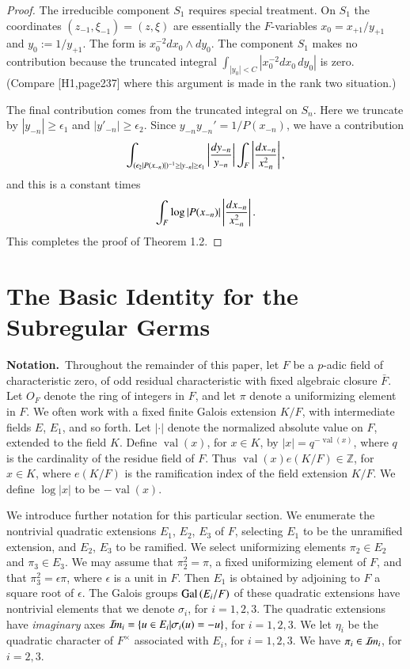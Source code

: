 \documentclass{amsart}
\newcommand\Z{{\mathbb Z}}
\newcommand\Gal{\hbox{Gal\,}}
\newcommand\Imm{{\mathcal I\hskip-.2em m}}
\newcommand\bF{{\bar F}}
\newcommand\val{\operatorname{val}}
\begin{document}
\begin{proof}
The irreducible component $S_1$ requires special treatment.
On $S_1$ the coordinates $(z_{-1},\xi_{-1}) = (z,\xi)$
are essentially the $F$-variables $x_0 = x_{+1}/y_{+1}$
and $y_0 := 1/y_{+1}$.  The form is $x_0^{-2} dx_0\wedge dy_0$.
The component $S_1$ makes no contribution because the truncated
integral $\int_{|y_0|< C} |x_0^{-2} dx_0\,dy_0|$ is zero.
(Compare [H1,page237] where this argument is made in the
rank two situation.)

The final contribution comes from the truncated integral on $S_n$.
Here we truncate by $|y_{-n}|\ge \epsilon_1$ and $|y'_{-n}|\ge \epsilon_2$.
Since $y_{-n}y_{-n}' = 1/P(x_{-n})$, we have a contribution
$$
\int_{(\epsilon_2 |P(x_{-n})|)^{-1} \ge |y_{-n}|\ge \epsilon_1}
\left| {dy_{-n}\over y_{-n}} \right |
\int_F \left|{dx_{-n}\over x_{-n}^2}\right |,$$
and this is a constant times
$$\int_F \log|P(x_{-n})| \left|{dx_{-n}\over x_{-n}^2}\right|.$$
This completes the proof of Theorem 1.2.
\end{proof}

\section{The Basic Identity for the Subregular Germs}

\noindent
{\bf Notation.}\  
Throughout the remainder of this paper,
let $F$ be a $p$-adic field of characteristic
zero, of odd residual characteristic with fixed
algebraic closure $\bF$.  Let $O_F$
denote the ring of integers in $F$, and let $\pi$ denote
a uniformizing element in $F$.
We often work with
a fixed finite Galois extension $K/F$, with intermediate
fields $E$, $E_1$, and so forth. 
Let $|\cdot|$ denote
the normalized absolute value on $F$, extended to the
field $K$.  Define $\val(x)$, for $x\in K$, by $|x| = q^{-\val(x)}$,
where $q$ is the cardinality of the residue field of $F$.  
Thus $\val(x) e(K/F) \in \Z$, for $x\in K$, 
where $e(K/F)$ is the
ramification index of the field extension $K/F$.  We define
$\log|x|$ to be $-\val(x)$.

We introduce further notation for this particular section.
We enumerate the
nontrivial quadratic extensions $E_1$, $E_2$, $E_3$ of $F$,
selecting $E_1$ to be the unramified extension, and $E_2$, $E_3$
to be ramified.  We select uniformizing elements $\pi_2\in E_2$
and $\pi_3\in E_3$.  We may assume that $\pi_2^2 = \pi$, a fixed
uniformizing element of $F$, and that $\pi_3^2 = \epsilon\pi$,
where $\epsilon$ is a unit in $F$.  Then $E_1$ is obtained by
adjoining to $F$ a square root of $\epsilon$.  The Galois
groups $\Gal(E_i/F)$ of these quadratic extensions have nontrivial
elements that we denote $\sigma_i$, for $i=1,2,3$.  The quadratic
extensions have {\it imaginary} axes $\Imm_i = \{u\in E_i| \sigma_i(u) = -u\}$,
for $i=1,2,3$.  We let $\eta_i$ be the 
quadratic character of $F^\times$
associated with $E_i$, for $i=1,2,3$.  We have $\pi_i\in \Imm_i$,
for $i=2,3$.
\end{document}
